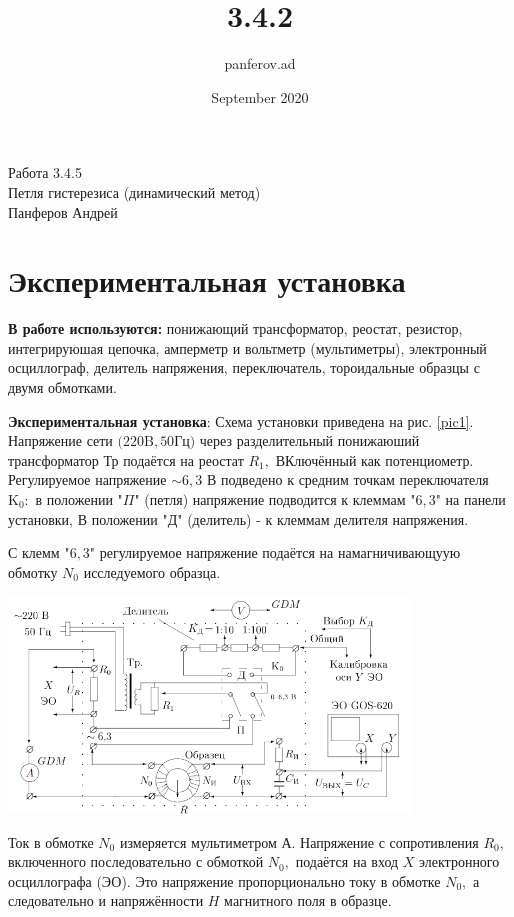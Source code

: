 \documentclass[12pt]{article}
\title{3.4.2}
\author{panferov.ad }
\date{September 2020}
\begin{document}
\begin{center}
  \LARGE{Работа 3.4.5}\\[0.2cm]
  \LARGE{Петля гистерезиса (динамический метод)}\\[0.2cm]
  \large{Панферов Андрей}\\[0.2cm]
\end{center}

\section{Экспериментальная установка}
\textbf{В работе используются:} понижающий трансформатор, реостат, резистор, интегрируюшая цепочка, амперметр и вольтметр (мультиметры), электронный осциллограф, делитель напряжения, переключатель, тороидальные образцы с двумя обмотками.

\textbf{Экспериментальная установка}: Схема установки приведена на рис. \ref{pic1}. Напряжение сети $(220 \mathrm{B}, 50$Гц$)$ через разделительный понижаюший трансформатор Тр подаётся на реостат $R_{1},$ ВКлючённый как потенциометр. Регулируемое напряжение $\sim 6,3$ В подведено к средним точкам переключателя $\mathrm{K}_{0}:$ в положении "$\Pi$" (петля) напряжение подводится к клеммам "$6,3$" на панели установки, В положении "Д" (делитель) - к клеммам делителя напряжения.

С клемм "$6,3$" регулируемое напряжение подаётся на намагничивающуую обмотку $N_{0}$ исследуемого образца.

\begin{center}
    \includegraphics[width=0.8\textwidth]{1.png}
    \label{pic1}
\end{center}

Ток в обмотке $N_{0}$ измеряется мультиметром А. Напряжение с сопротивления $R_{0},$ включенного последовательно с обмоткой $N_{0},$ подаётся на вход $X$ электронного осциллографа (ЭО). Это напряжение пропорционально току в обмотке $N_{0},$ а следовательно и напряжённости $H$ магнитного поля в образце.
\end{document}
